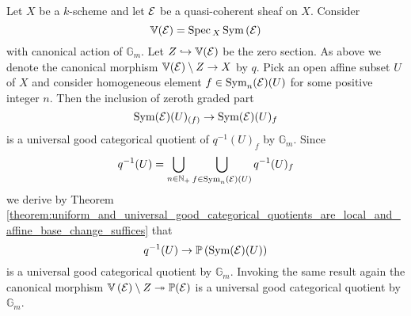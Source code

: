 \begin{example}\label{example:projective_bundles_as_quotients}
Let $X$ be a $k$-scheme and let ${\mathcal E}$ be a quasi-coherent sheaf on $X$. Consider 
$$\mathbb{V}({\mathcal E}) = \mathrm{Spec}\,_X\,\textrm{Sym}\left({\mathcal E}\right)$$
with canonical action of $\mathbb{G}_m$. Let $Z\hookrightarrow \mathbb{V}({\mathcal E})$ be the zero section. As above we denote the canonical morphism $\mathbb{V}({\mathcal E})\setminus Z\rightarrow X$ by $q$. Pick an open affine subset $U$ of $X$ and consider homogeneous element $f\in \textrm{Sym}_n({\mathcal E})(U)$ for some positive integer $n$. Then the inclusion of zeroth graded part
$$\textrm{Sym}({\mathcal E})(U)_{(f)}\rightarrow \textrm{Sym}({\mathcal E})(U)_f$$
is a universal good categorical quotient of $q^{-1}(U)_f$ by $\mathbb{G}_m$. Since
$$q^{-1}(U) = \bigcup_{n\in {\mathbb N}_+}\bigcup_{f\in \textrm{Sym}_n({\mathcal E})(U)}q^{-1}(U)_f$$
we derive by Theorem \ref{theorem:uniform_and_universal_good_categorical_quotients_are_local_and_affine_base_change_suffices} that 
$$q^{-1}(U) \rightarrow \mathbb{P}\left(\textrm{Sym}({\mathcal E})(U)\right)$$
is a universal good categorical quotient by $\mathbb{G}_m$. Invoking the same result again the canonical morphism $\mathbb{V}\left({\mathcal E}\right)\setminus Z\twoheadrightarrow \mathbb{P}({\mathcal E})$ is a universal good categorical quotient by $\mathbb{G}_m$.
\end{example}

